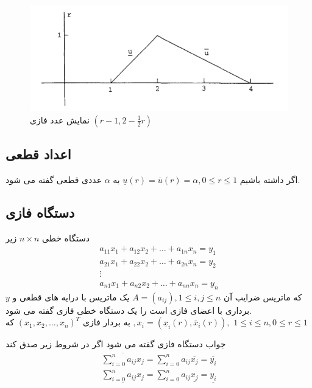  	\begin{figure}[h]
 	\centering
 	\includegraphics[width=0.6\linewidth]{assets/fuzzy_num.png}
 	\caption{نمایش عدد فازی $ \left( r - 1, 2 - \frac{1}{2} r \right)$ }
	\end{figure}
 
 	\pagebreak 
 	
 	\subsection{اعداد قطعی}
 	اگر داشته باشیم 
 	$ \underline{u}\left(r\right) = \overline{u}\left(r\right) = \alpha, 0 \leq r \leq 1 $ 
 	به $ \alpha $ عددی قطعی  گفته می شود. 
	\subsection{دستگاه فازی}
	
	دستگاه خطی $ n \times n $ زیر 
	\begin{equation}
	\label{eq:1}
	\begin{split}
	 a_{11}x_1 + a_{12}x_2 + \ldots + a_{1n}x_n = y_1 \\
	 a_{21}x_1 + a_{22}x_2 + \ldots + a_{2n}x_n = y_2 \\
	\vdots\\
	 a_{n1}x_1 + a_{n2}x_2 + \ldots + a_{nn}x_n = y_n 
	\end{split}
	\end{equation}
	که ماتریس ضرایب آن 
	$ A = \left(a_{ij}\right), 1 \leq i, j \leq n$ 
	یک ماتریس با درایه های قطعی و $ y $ برداری با اعضای فازی است را یک دستگاه خطی فازی  گفته می شود. \\
	به بردار فازی
	$ \left(x_1, x_2, \ldots, x_n\right)^T $
	که
	$ , x_i = \left(\underline{x}_i\left(r\right), \overline{x}_i\left(r\right)\right), $
	$ 1 \leq i \leq n, 0 \leq r \leq 1 $ 

	جواب دستگاه فازی گفته می شود اگر در شروط زیر صدق کند 
	\begin{equation}
	\label{eq:2}
	\begin{split}
		\overline{\sum_{i=0}^{n}a_{ij}x_j} = \sum_{i=0}^{n} a_{ij}\overline{x_j} = \overline{y_i}  \\
		\underline{\sum_{i=0}^{n}a_{ij}x_j} = \sum_{i=0}^{n} a_{ij}\underline{x_j} = \underline{y_i}
	\end{split} 
	\end{equation}    
	
